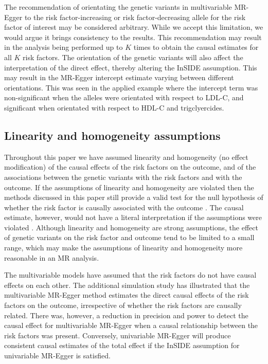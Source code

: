 \documentclass[a4paper,12pt]{article}
\begin{document}
\begin{bibunit}[wileyj]
The recommendation of orientating the genetic variants in multivariable MR-Egger to the risk factor-increasing or risk factor-decreasing allele for the risk factor of interest may be considered arbitrary. While we accept this limitation, we would argue it brings consistency to the results. This recommendation may result in the analysis being performed up to $K$ times to obtain the causal estimates for all $K$ risk factors. The orientation of the genetic variants will also affect the interpretation of the direct effect, thereby altering the InSIDE assumption. This may result in the MR-Egger intercept estimate varying between different orientations. This was seen in the applied example where the intercept term was non-significant when the alleles were orientated with respect to LDL-C, and significant when orientated with respect to HDL-C and trigclyercides.

\subsection{Linearity and homogeneity assumptions}
Throughout this paper we have assumed linearity and homogeneity (no effect modification) of the causal effects of the risk factors on the outcome, and of the associations between the genetic variants with the risk factors and with the outcome. If the assumptions of linearity and homogeneity are violated then the methods discussed in this paper still provide a valid test for the null hypothesis of whether the risk factor is causally associated with the outcome \cite{burgess2016multiple}. The causal estimate, however, would not have a literal interpretation if the assumptions were violated \cite{burgess2015beyond}. Although linearity and homogeneity are strong assumptions, the effect of genetic variants on the risk factor and outcome tend to be limited to a small range, which may make the assumptions of linearity and homogeneity more reasonable in an MR analysis.

The multivariable models have assumed that the risk factors do not have causal effects on each other. The additional simulation study has illustrated that the multivariable MR-Egger method estimates the direct causal effects of the risk factors on the outcome, irrespective of whether the risk factors are causally related. There was, however, a reduction in precision and power to detect the causal effect for multivariable MR-Egger when a causal relationship between the risk factors was present. Conversely, univariable MR-Egger will produce consistent causal estimates of the total effect if the InSIDE assumption for univariable MR-Egger is satisfied.  


\end{bibunit}
\end{document}
